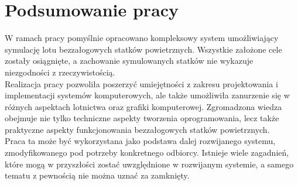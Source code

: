 \chapter{Podsumowanie pracy}


W ramach pracy pomyślnie opracowano kompleksowy system umożliwiający symulację lotu bezzałogowych statków powietrznych. Wszystkie założone cele zostały osiągnięte, a zachowanie symulowanych statków nie wykazuje niezgodności z rzeczywistością.\\

Realizacja pracy pozwoliła poszerzyć umiejętności z zakresu projektowania i implementacji systemów komputerowych, ale także umożliwiła zanurzenie się w różnych aspektach lotnictwa oraz grafiki komputerowej. Zgromadzona wiedza obejmuje nie tylko techniczne aspekty tworzenia oprogramowania, lecz także praktyczne aspekty funkcjonowania bezzałogowych statków powietrznych.\\

Praca ta może być wykorzystana jako podstawa dalej rozwijanego systemu, zmodyfikowanego pod potrzeby konkretnego odbiorcy. Istnieje wiele zagadnień, które mogą w przyszłości zostać uwzględnione w rozwijanym systemie, a samego tematu z pewnością nie można uznać za zamknięty.